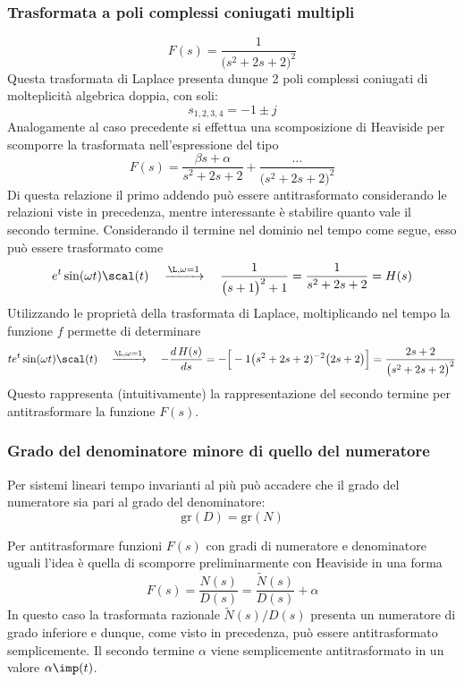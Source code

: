 		\subsubsection{Trasformata a poli complessi coniugati multipli}
			\[ F(s) = \frac{1}{\big(s^2 + 2s + 2\big)^2} \]
			Questa trasformata di Laplace presenta dunque 2 poli complessi coniugati di molteplicità algebrica doppia, con soli:
			\[ s_{1,2,3,4} = -1\pm j\]
			Analogamente al caso precedente si effettua una scomposizione di Heaviside per scomporre la trasformata nell'espressione del tipo
			\[ F(s) = \frac{\beta s+ \alpha}{s^2+2s + 2} + \frac{\dots}{\big(s^2+2s+2\big)^2} \]
			Di questa relazione il primo addendo può essere antitrasformato considerando le relazioni viste in precedenza, mentre interessante è stabilire quanto vale il secondo termine. Considerando il termine nel dominio nel tempo come segue, esso può essere trasformato come
			\[ e^t \sin(\omega t) \scal(t) \quad \xrightarrow{\L, \omega=1} \quad \frac 1 {\big(s+1\big)^2+1} = \frac 1 {s^2+2s+2} =H(s) \]
			Utilizzando le proprietà della trasformata di Laplace, moltiplicando nel tempo la funzione $f$ permette di determinare
			\[ t e^t \sin(\omega t) \scal(t) \quad \xrightarrow{\L,\omega = 1} \quad - \frac{d\, H(s)}{ds} = - \Big[-1 \big(s^2+2s+2)^{-2} \big(2s+2\big) \Big] = \frac{2s+2}{\big(s^2+2s+2\big)^2} \]
			Questo rappresenta (intuitivamente) la rappresentazione del secondo termine per antitrasformare la funzione $F(s)$.
			
		\subsubsection{Grado del denominatore minore di quello del numeratore}			
			\begin{nota}
				Per sistemi lineari tempo invarianti al più può accadere che il grado del numeratore sia pari al grado del denominatore:
				\[ \textrm{gr}(D)=\textrm{gr}(N) \]
			\end{nota}
			Per antitrasformare funzioni $F(s)$ con gradi di numeratore e denominatore uguali l'idea è quella di scomporre preliminarmente con Heaviside in una forma
			\[ F(s) = \frac{N(s)}{D(s)} = \frac{\tilde{N}(s)}{D(s)} +\alpha  \]
			In questo caso la trasformata razionale $\tilde N(s)/D(s)$ presenta un numeratore di grado inferiore e dunque, come visto in precedenza, può essere antitrasformato semplicemente. Il secondo termine $\alpha$ viene semplicemente antitrasformato in un valore $\alpha \imp(t)$.
			

